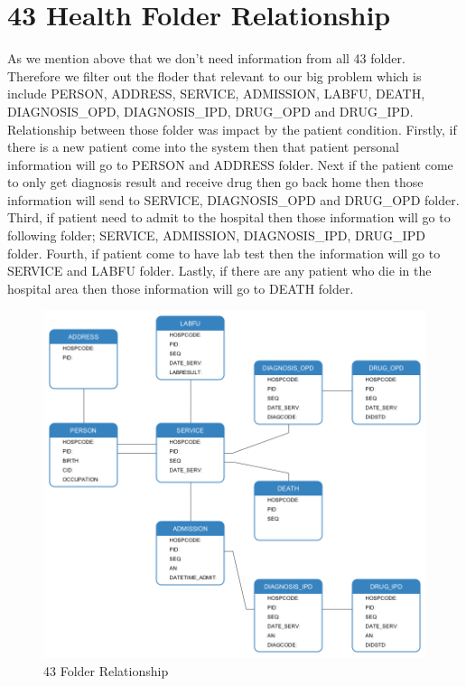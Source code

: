 \section{43 Health Folder Relationship}
    As we mention above that we don't need information from all 43 folder. Therefore we filter out the floder that relevant to our big problem which is include PERSON, ADDRESS, SERVICE, ADMISSION, LABFU, DEATH, DIAGNOSIS\_OPD, DIAGNOSIS\_IPD, DRUG\_OPD and DRUG\_IPD. Relationship between those folder was impact by the patient condition. Firstly, if there is a new patient come into the system then that patient personal information will go to PERSON and ADDRESS folder. Next if the patient come to only get diagnosis result and receive drug then go back home then those information will send to SERVICE, DIAGNOSIS\_OPD and DRUG\_OPD folder. Third, if patient need to admit to the hospital then those information will go to following folder; SERVICE, ADMISSION, DIAGNOSIS\_IPD, DRUG\_IPD folder. Fourth, if patient come to have lab test then the information will go to SERVICE and LABFU folder. Lastly, if there are any patient who die in the hospital area then those information will go to DEATH folder.
        \FloatBarrier
        \begin{figure}[h!]
            \centering
        		\includegraphics[width=\linewidth]{images/chapter-04/43-folders-relationship.png}
            	\caption{43 Folder Relationship}
        		\label{figure-43-folder-relationship}
        \end{figure}
        \FloatBarrier

